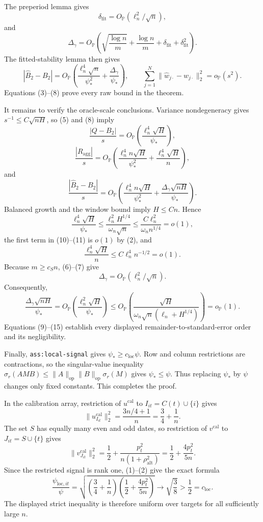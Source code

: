The preperiod lemma gives
\[
 \delta_{\mathrm{fit}}=O_{\mathbb P}(\ell_n^2/\sqrt n),
 \tag{6}
\]
and
\[
 \Delta_\gamma=O_{\mathbb P}\!\left(
 \sqrt{\frac{\log n}{m}}+\frac{\log n}{m}
 +\delta_{\mathrm{fit}}+\delta_{\mathrm{fit}}^2\right).
 \tag{7}
\]
The fitted-stability lemma then gives
\[
 |\widehat B_2-B_2|=O_{\mathbb P}\!\left(
 \frac{\ell_n^4\sqrt n}{\psi_*^2}
 +\frac{\Delta_\gamma}{\psi_*}\right),
 \qquad
 \sum_{j=1}^N\|\widehat w_{j\cdot}-w_{j\cdot}\|_2^2=o_{\mathbb P}(s^2).
 \tag{8}
\]
Equations (3)--(8) prove every raw bound in the theorem.

It remains to verify the oracle-scale conclusions.  Variance nondegeneracy gives \(s^{-1}\le C\sqrt{nH}\), so (5) and (8) imply
\[
 \frac{|Q-B_2|}{s}
 =O_{\mathbb P}\!\left(\frac{\ell_n^4\sqrt H}{\psi_*}\right),
 \tag{9}
\]
\[
 \frac{|R_{\mathrm{agg}}|}{s}
 =O_{\mathbb P}\!\left(
 \frac{\ell_n^4n\sqrt H}{\psi_*^2}
 +\frac{\ell_n^4\sqrt H}{n}\right),
 \tag{10}
\]
and
\[
 \frac{|\widehat B_2-B_2|}{s}
 =O_{\mathbb P}\!\left(
 \frac{\ell_n^4n\sqrt H}{\psi_*^2}
 +\frac{\Delta_\gamma\sqrt{nH}}{\psi_*}\right).
 \tag{11}
\]
Balanced growth and the window bound imply \(H\le Cn\).  Hence
\[
 \frac{\ell_n^4\sqrt H}{\psi_*}
 \le\frac{\ell_n^2H^{1/4}}{\omega_n\sqrt n}
 \le\frac{C\ell_n^2}{\omega_n n^{1/4}}=o(1),
 \tag{12}
\]
the first term in (10)--(11) is \(o(1)\) by (2), and
\[
 \frac{\ell_n^4\sqrt H}{n}\le C\ell_n^4n^{-1/2}=o(1).
 \tag{13}
\]
Because \(m\ge c_Sn\), (6)--(7) give
\[
 \Delta_\gamma=O_{\mathbb P}(\ell_n^2/\sqrt n).
 \tag{14}
\]
Consequently,
\[
 \frac{\Delta_\gamma\sqrt{nH}}{\psi_*}
 =O_{\mathbb P}\!\left(\frac{\ell_n^2\sqrt H}{\psi_*}\right)
 \le O_{\mathbb P}\!\left(
 \frac{\sqrt H}{\omega_n\sqrt n(\ell_n+H^{1/4})}\right)
 =o_{\mathbb P}(1).
 \tag{15}
\]
Equations (9)--(15) establish every displayed remainder-to-standard-error order and its negligibility.

Finally, \texttt{ass:local-signal} gives \(\psi_*\ge c_{\mathrm{loc}}\psi\).  Row and column restrictions are contractions, so the singular-value inequality \(\sigma_r(AMB)\le\|A\|_{\mathrm{op}}\|B\|_{\mathrm{op}}\sigma_r(M)\) gives \(\psi_*\le\psi\).  Thus replacing \(\psi_*\) by \(\psi\) changes only fixed constants.  This completes the proof.

In the calibration array, restriction of \(u^{\mathrm{cal}}\) to \(I_{it}=C(t)\cup\{i\}\) gives
\[
 \|u^{\mathrm{cal}}_{I_{it}}\|_2^2
 =\frac{3n/4+1}{n}=\frac34+\frac1n.
 \tag{1}
\]
The set \(S\) has equally many even and odd dates, so restriction of \(v^{\mathrm{cal}}\) to \(J_{it}=S\cup\{t\}\) gives
\[
 \|v^{\mathrm{cal}}_{J_{it}}\|_2^2
 =\frac12+\frac{p_t^2}{n(1+\rho_{\mathrm{alt}}^2)}
 =\frac12+\frac{4p_t^2}{5n}.
 \tag{2}
\]
Since the restricted signal is rank one, (1)--(2) give the exact formula
\[
 \frac{\psi_{\mathrm{loc},it}}\psi
 =\sqrt{\left(\frac34+\frac1n\right)
 \left(\frac12+\frac{4p_t^2}{5n}\right)}
 \longrightarrow\sqrt{\frac38}>\frac12=c_{\mathrm{loc}}.
 \tag{3}
\]
The displayed strict inequality is therefore uniform over targets for all sufficiently large \(n\).

